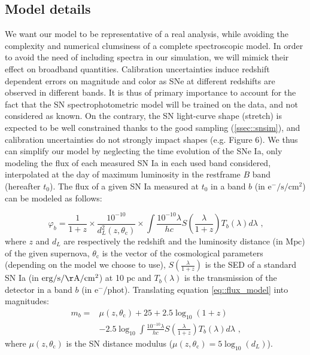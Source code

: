 \documentclass[\docopts]{\docclass}
\begin{document}
\subsection{Model details}
\label{subsec::model_details}
We want our model to be representative of a real analysis, while avoiding the complexity and numerical clumsiness of a complete spectroscopic model.
In order to avoid the need of including spectra in our simulation, we will mimick their effect on broadband quantities.
Calibration uncertainties induce redshift dependent errors on magnitude and color as SNe at different redshifts are observed in different bands.
It is thus of primary importance to account for the fact that the SN spectrophotometric model will be trained on the data, and not considered as known.
On the contrary, the SN light-curve shape (stretch) is expected to be well constrained thanks to the good sampling (\ref{ssec::snsim}), and calibration uncertainties do not strongly impact shapes (e.g. \cite{1401.4064} Figure 6).
We thus can simplify our model by neglecting the time evolution of the SNe Ia, only modeling the flux of each measured SN Ia in each used band considered, interpolated at the day of maximum luminosity in the restframe $B$ band (hereafter $t_0$).
The flux of a given SN Ia measured at $t_0$ in a band $b$ (in $\mathrm{e^{-}/s/cm^2}$) can be modeled as follows:

\begin{equation}
\label{eq::flux_model}
\varphi_b = \frac{1}{1+z} \times \frac{10^{-10}}{d_L^2(z, \theta_\text{c})}\times \int \frac{10^{-10}\lambda}{hc} S\left(\frac{\lambda}{1+z}\right) T_b(\lambda) d\lambda \text{ ,}
\end{equation}
where $z$ and $d_L$ are respectively the redshift and the luminosity distance (in $\mathrm{Mpc}$) of the given supernova,
$\theta_\text{c}$ is the vector of the cosmological parameters (depending on the model we choose to use),
$S\left(\frac{\lambda}{1+z}\right)$ is the SED of a standard SN Ia (in $\mathrm{erg/s/\AA/cm^2}$) at 10 $\mathrm{pc}$ and $T_b(\lambda)$ is the transmission of the detector in a band $b$ (in $\mathrm{e^-/phot}$).
Translating equation \ref{eq::flux_model} into magnitudes:
\begin{equation}
\begin{split}
\label{eq::raw_model}
m_b = &\mu(z, \theta_\text{c}) + 25 + 2.5\log_{10}(1+z) \\
&- 2.5\log_{10}\int \frac{10^{-10}\lambda}{hc} S\left(\frac{\lambda}{1+z}\right) T_b(\lambda) d\lambda \text{ ,}
\end{split}
\end{equation}
where $\mu(z, \theta_\text{c})$ is the SN distance modulus ($\mu(z, \theta_\text{c}) = 5\log_{10}(d_L)$).
\end{document}
